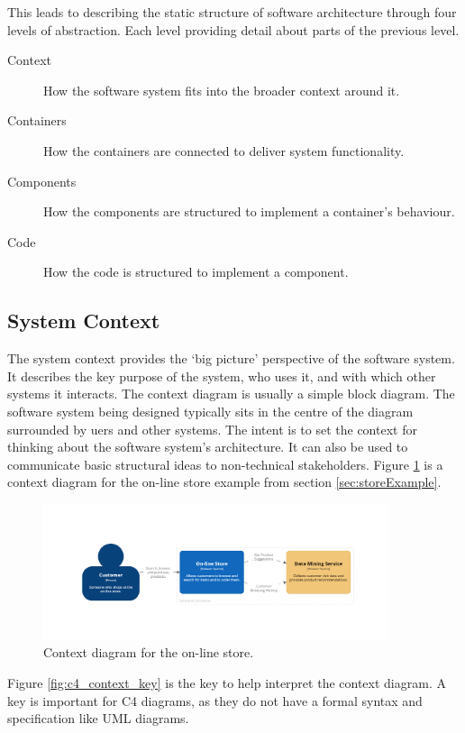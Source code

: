 \noindent
This leads to describing the static structure of software architecture through four levels of abstraction.
Each level providing detail about parts of the previous level.
\begin{description}
    \item[Context] How the software system fits into the broader context around it.
    \item[Containers] How the containers are connected to deliver system functionality.
    \item[Components] How the components are structured to implement a container's behaviour.
    \item[Code] How the code is structured to implement a component.
\end{description}

\subsection{System Context}
The system context provides the `big picture' perspective of the software system.
It describes the key purpose of the system, who uses it, and with which other systems it interacts.
The context diagram is usually a simple block diagram.
The software system being designed typically sits in the centre of the diagram surrounded by uers and other systems.
The intent is to set the context for thinking about the software system's architecture.
It can also be used to communicate basic structural ideas to non-technical stakeholders.
Figure \ref{fig:c4_context} is a context diagram for the on-line store example from section \ref{sec:storeExample}.

\begin{figure}[h]
    \centering
    \includegraphics[trim=230 240 230 270,clip,width=0.9\textwidth]{images/c4/context_diagram.png}
    \caption{Context diagram for the on-line store.}
    \label{fig:c4_context}
\end{figure}

\noindent
Figure \ref{fig:c4_context_key} is the key to help interpret the context diagram.
A key is important for C4 diagrams, as they do not have a formal syntax and specification like UML diagrams.

